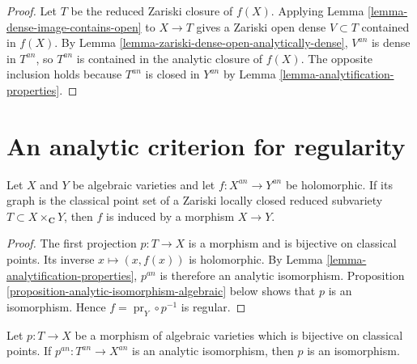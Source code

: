 \begin{proof}
Let $T$ be the reduced Zariski closure of $f(X)$. Applying
Lemma \ref{lemma-dense-image-contains-open} to $X\to T$ gives a Zariski open
dense $V\subset T$ contained in $f(X)$. By
Lemma \ref{lemma-zariski-dense-open-analytically-dense}, $V^{an}$ is dense in
$T^{an}$, so $T^{an}$ is contained in the analytic closure of $f(X)$. The
opposite inclusion holds because $T^{an}$ is closed in $Y^{an}$ by
Lemma \ref{lemma-analytification-properties}.
\end{proof}

\section{An analytic criterion for regularity}
\label{section-analytic-regularity}

\begin{proposition}
\label{proposition-algebraic-graph-holomorphic-regular}
Let $X$ and $Y$ be algebraic varieties and let
$f : X^{an}\to Y^{an}$ be holomorphic. If its graph is the classical point
set of a Zariski locally closed reduced subvariety
$T\subset X\times_{\mathbf C}Y$, then $f$ is induced by a morphism
$X\to Y$.
\end{proposition}

\begin{proof}
The first projection $p:T\to X$ is a morphism and is bijective on classical
points. Its inverse $x\mapsto(x,f(x))$ is holomorphic. By
Lemma \ref{lemma-analytification-properties}, $p^{an}$ is therefore an
analytic isomorphism. Proposition
\ref{proposition-analytic-isomorphism-algebraic} below shows that $p$ is an
isomorphism. Hence $f=\operatorname{pr}_Y\circ p^{-1}$ is regular.
\end{proof}

\begin{proposition}
\label{proposition-analytic-isomorphism-algebraic}
Let $p:T\to X$ be a morphism of algebraic varieties which is bijective on
classical points. If $p^{an}:T^{an}\to X^{an}$ is an analytic isomorphism,
then $p$ is an isomorphism.
\end{proposition}

